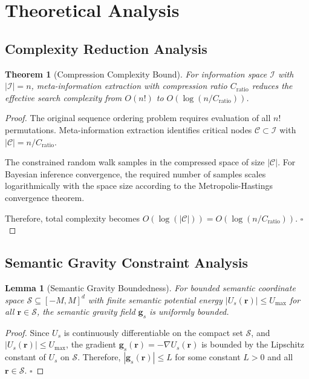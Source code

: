\documentclass[12pt,a4paper]{article}
\newtheorem{theorem}{Theorem}
\newtheorem{lemma}{Lemma}
\begin{document}
\section{Theoretical Analysis}

\subsection{Complexity Reduction Analysis}

\begin{theorem}[Compression Complexity Bound]
For information space $\mathcal{I}$ with $|\mathcal{I}| = n$, meta-information extraction with compression ratio $C_{\text{ratio}}$ reduces the effective search complexity from $O(n!)$ to $O(\log(n/C_{\text{ratio}}))$.
\end{theorem}

\begin{proof}
The original sequence ordering problem requires evaluation of all $n!$ permutations. Meta-information extraction identifies critical nodes $\mathcal{C} \subset \mathcal{I}$ with $|\mathcal{C}| = n/C_{\text{ratio}}$. 

The constrained random walk samples in the compressed space of size $|\mathcal{C}|$. For Bayesian inference convergence, the required number of samples scales logarithmically with the space size according to the Metropolis-Hastings convergence theorem.

Therefore, total complexity becomes $O(\log(|\mathcal{C}|)) = O(\log(n/C_{\text{ratio}}))$. $\square$
\end{proof}

\subsection{Semantic Gravity Constraint Analysis}

\begin{lemma}[Semantic Gravity Boundedness]
For bounded semantic coordinate space $\mathcal{S} \subseteq [-M, M]^d$ with finite semantic potential energy $|U_s(\mathbf{r})| \leq U_{\max}$ for all $\mathbf{r} \in \mathcal{S}$, the semantic gravity field $\mathbf{g}_s$ is uniformly bounded.
\end{lemma}

\begin{proof}
Since $U_s$ is continuously differentiable on the compact set $\mathcal{S}$, and $|U_s(\mathbf{r})| \leq U_{\max}$, the gradient $\mathbf{g}_s(\mathbf{r}) = -\nabla U_s(\mathbf{r})$ is bounded by the Lipschitz constant of $U_s$ on $\mathcal{S}$. Therefore, $|\mathbf{g}_s(\mathbf{r})| \leq L$ for some constant $L > 0$ and all $\mathbf{r} \in \mathcal{S}$. $\square$
\end{proof}
\end{document}
